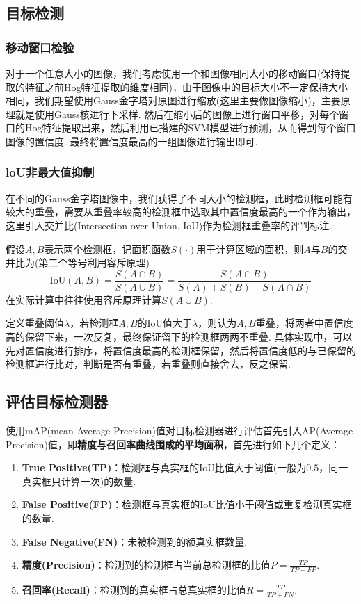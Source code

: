 \documentclass[12pt, a4paper, oneside]{ctexart}
\numberwithin{equation}{section}  %
\def\add{\vspace{1ex}}      %
\begin{document}
\subsection{目标检测}
\subsubsection{移动窗口检验}
对于一个任意大小的图像，我们考虑使用一个和图像相同大小的移动窗口(保持提取的特征之前Hog特征提取的维度相同)，由于图像中的目标大小不一定保持大小相同，我们期望使用Gauss金字塔对原图进行缩放(这里主要做图像缩小)，主要原理就是使用Gauss核进行下采样. 然后在缩小后的图像上进行窗口平移，对每个窗口的Hog特征提取出来，然后利用已搭建的SVM模型进行预测，从而得到每个窗口图像的置信度. 最终将置信度最高的一组图像进行输出即可.
\subsubsection{loU非最大值抑制}
在不同的Gauss金字塔图像中，我们获得了不同大小的检测框，此时检测框可能有较大的重叠，需要从重叠率较高的检测框中选取其中置信度最高的一个作为输出，这里引入交并比(Intersection over Union, IoU)作为检测框重叠率的评判标注.

假设$A,B$表示两个检测框，记面积函数$S(\cdot)$用于计算区域的面积，则$A$与$B$的交并比为(第二个等号利用容斥原理)
\begin{equation*}
  \text{IoU}(A,B) = \frac{S(A\cap B)}{S(A\cup B)} = \frac{S(A\cap B)}{S(A)+S(B)-S(A\cap B)}
\end{equation*}
在实际计算中往往使用容斥原理计算$S(A\cup B)$.

定义重叠阈值$\lambda$，若检测框$A,B$的IoU值大于$\lambda$，则认为$A,B$重叠，将两者中置信度高的保留下来，一次反复，最终保证留下的检测框两两不重叠. 具体实现中，可以先对置信度进行排序，将置信度最高的检测框保留，然后将置信度低的与已保留的检测框进行比对，判断是否有重叠，若重叠则直接舍去，反之保留.

\subsection{评估目标检测器}
使用mAP(mean Average Precision)值对目标检测器进行评估首先引入AP(Average Precision)值，即\textbf{精度与召回率曲线围成的平均面积}，首先进行如下几个定义：
\begin{enumerate}
  \item \textbf{True Positive(TP)}：检测框与真实框的IoU比值大于阈值(一般为$0.5$，同一真实框只计算一次)的数量.
  \item \textbf{False Positive(FP)}：检测框与真实框的IoU比值小于阈值或重复检测真实框的数量.
  \item \textbf{False Negative(FN)}：未被检测到的额真实框数量.
  \item \textbf{精度(Precision)}：检测到的检测框占当前总检测框的比值$P = \frac{TP}{TP + FP}$.\add
  \item \textbf{召回率(Recall)}：检测到的真实框占总真实框的比值$R = \frac{TP}{TP + FN}$.
\end{enumerate}
\end{document}
